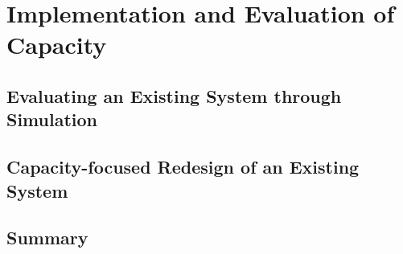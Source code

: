 \chapter{Implementation and Evaluation of Capacity}
\label{cha:permacam}







\section{Evaluating an Existing System through Simulation}

\section{Capacity-focused Redesign of an Existing System}


\section{Summary}